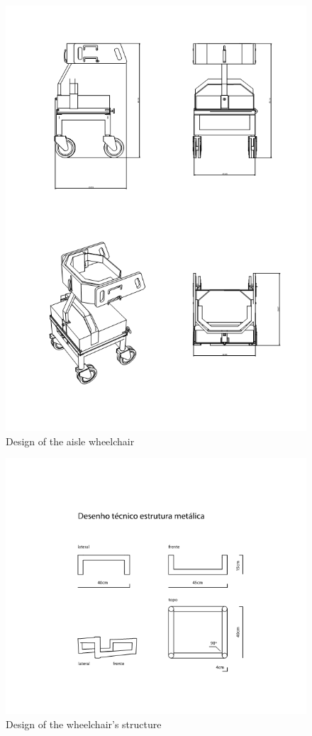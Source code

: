 \begin{figure}[h]
\centering
\includegraphics[width=15cm]{images/geral.png}
\caption{Design of the aisle wheelchair}
\label{fig:designwheelchair}
\end{figure}

\begin{figure}[h]
\centering
\includegraphics[width=15cm]{images/DesenhoTecnicoEstrutura.png}
\caption{Design of the wheelchair's  structure}
\label{fig:wheelchairstructure4}
\end{figure}

